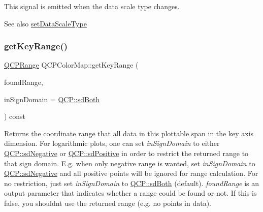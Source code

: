 This signal is emitted when the data scale type changes.

\begin{DoxySeeAlso}{See also}
\hyperlink{class_q_c_p_color_map_a9d20aa08e3c1f20f22908c45b9c06511}{set\+Data\+Scale\+Type} 
\end{DoxySeeAlso}
\mbox{\label{class_q_c_p_color_map_a985861974560f950af6cb7fae8c46267}} 
\subsubsection{\texorpdfstring{get\+Key\+Range()}{getKeyRange()}}
{\footnotesize\ttfamily \hyperlink{class_q_c_p_range}{Q\+C\+P\+Range} Q\+C\+P\+Color\+Map\+::get\+Key\+Range (\begin{DoxyParamCaption}\item[{bool \&}]{found\+Range,  }\item[{\hyperlink{namespace_q_c_p_afd50e7cf431af385614987d8553ff8a9}{Q\+C\+P\+::\+Sign\+Domain}}]{in\+Sign\+Domain = {\ttfamily \hyperlink{namespace_q_c_p_afd50e7cf431af385614987d8553ff8a9aa38352ef02d51ddfa4399d9551566e24}{Q\+C\+P\+::sd\+Both}} }\end{DoxyParamCaption}) const\hspace{0.3cm}{\ttfamily [virtual]}}

Returns the coordinate range that all data in this plottable span in the key axis dimension. For logarithmic plots, one can set {\itshape in\+Sign\+Domain} to either \hyperlink{namespace_q_c_p_afd50e7cf431af385614987d8553ff8a9a2d18af0bc58f6528d1e82ce699fe4829}{Q\+C\+P\+::sd\+Negative} or \hyperlink{namespace_q_c_p_afd50e7cf431af385614987d8553ff8a9a584784b75fb816abcc627cf743bb699f}{Q\+C\+P\+::sd\+Positive} in order to restrict the returned range to that sign domain. E.\+g. when only negative range is wanted, set {\itshape in\+Sign\+Domain} to \hyperlink{namespace_q_c_p_afd50e7cf431af385614987d8553ff8a9a2d18af0bc58f6528d1e82ce699fe4829}{Q\+C\+P\+::sd\+Negative} and all positive points will be ignored for range calculation. For no restriction, just set {\itshape in\+Sign\+Domain} to \hyperlink{namespace_q_c_p_afd50e7cf431af385614987d8553ff8a9aa38352ef02d51ddfa4399d9551566e24}{Q\+C\+P\+::sd\+Both} (default). {\itshape found\+Range} is an output parameter that indicates whether a range could be found or not. If this is false, you shouldn\textquotesingle{}t use the returned range (e.\+g. no points in data).

